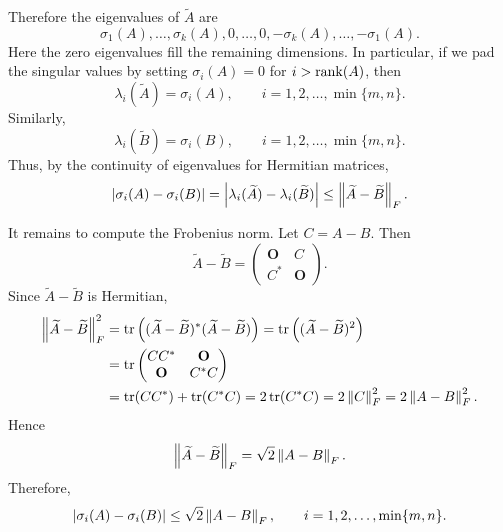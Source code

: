 \begin{pfbox}
Therefore the eigenvalues of $\widetilde{A}$ are
\[
    \sigma_1(A),\ldots,\sigma_k(A),
    0,\ldots,0,
    -\sigma_k(A),\ldots,-\sigma_1(A).
\]
Here the zero eigenvalues fill the remaining dimensions. In particular, if
we pad the singular values by setting $\sigma_i(A)=0$ for
$i>\operatorname{rank}(A)$, then
\[
    \lambda_i(\widetilde{A})=\sigma_i(A),
    \qquad
    i=1,2,\ldots,\min\{m,n\}.
\]
Similarly,
\[
    \lambda_i(\widetilde{B})=\sigma_i(B),
    \qquad
    i=1,2,\ldots,\min\{m,n\}.
\]
Thus, by the continuity of eigenvalues for Hermitian matrices,
\[
    \left\lvert \sigma_i(A)-\sigma_i(B) \right\rvert
    =
    \left\lvert \lambda_i(\widetilde{A})-\lambda_i(\widetilde{B}) \right\rvert
    \le
    \left\lVert \widetilde{A}-\widetilde{B} \right\rVert_F.
\]

It remains to compute the Frobenius norm. Let $C=A-B$. Then
\[
    \widetilde{A}-\widetilde{B}
    =
    \begin{pmatrix}
        \mathbf{O} & C \\
        C^*        & \mathbf{O}
    \end{pmatrix}.
\]
Since $\widetilde{A}-\widetilde{B}$ is Hermitian,
\begin{align*}
    \left\lVert \widetilde{A}-\widetilde{B} \right\rVert_F^2
    &=
    \operatorname{tr}\left( (\widetilde{A}-\widetilde{B})^*
    (\widetilde{A}-\widetilde{B}) \right) =  \operatorname{tr}\left( (\widetilde{A}-\widetilde{B})^2 \right)  \\                            
    &=
    \operatorname{tr}
    \begin{pmatrix}
        CC^*       & \mathbf{O} \\
        \mathbf{O} & C^*C
    \end{pmatrix}                                                        \\
    &=
    \operatorname{tr}(CC^*)+\operatorname{tr}(C^*C) = 2\operatorname{tr}(C^*C) = 2\left\lVert C \right\rVert_F^2 = 2\left\lVert A-B \right\rVert_F^2.
\end{align*}
Hence
\[
    \left\lVert \widetilde{A}-\widetilde{B} \right\rVert_F
    =
    \sqrt{2}\left\lVert A-B \right\rVert_F.
\]
Therefore,
\[
    \left\lvert \sigma_i(A)-\sigma_i(B) \right\rvert
    \le
    \sqrt{2}\left\lVert A-B \right\rVert_F,
    \qquad
    i=1,2,\ldots,\min\{m,n\}.
\]
\end{pfbox}

